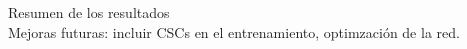 Resumen de los resultados \\


Mejoras futuras: incluir CSCs en el entrenamiento, optimzaci\'on de la red. \\
